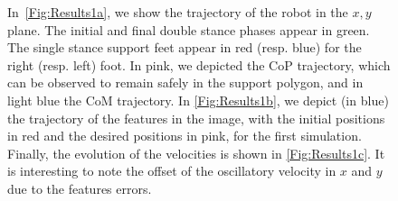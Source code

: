 \begin{figure}[ht]
{ \label{Fig:Results1c}
 }
 \caption[]{\label{Fig:Results1}\small{In~\ref{Fig:Results1a}, we show the trajectory of the robot in the $x,y$ plane. The initial and final double stance phases appear in green. The single stance support feet appear in red (resp. blue) for the right (resp. left) foot. In pink, we depicted the CoP trajectory, which can be observed to remain safely in the support polygon, and in light blue the CoM trajectory. In \ref{Fig:Results1b}, we depict (in blue) the trajectory of the features in the image, with the initial positions in red and the desired positions in pink, for the first simulation.  Finally, the evolution of the velocities is shown in \ref{Fig:Results1c}. It is interesting to note the offset of the oscillatory velocity in $x$ and $y$ due to the features errors.}}
 \end{figure}


